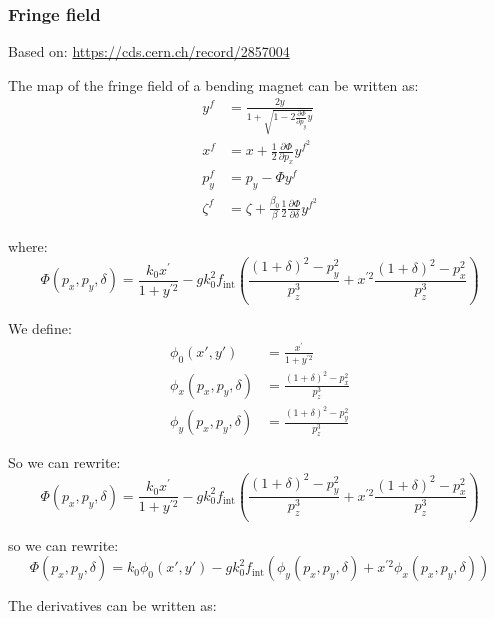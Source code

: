 \subsubsection{Fringe field}

Based on: \url{https://cds.cern.ch/record/2857004}

The map of the fringe field of a bending magnet can be written as:
\begin{align} 
y^f & =\frac{2 y}{1+\sqrt{1-2 \frac{\partial \Phi}{\partial p_y} y}} \\ 
x^f & =x+\frac{1}{2} \frac{\partial \Phi}{\partial p_x} y^{f^2} \\
p_y^f & =p_y-\Phi y^f \\ 
\zeta^f & =\zeta+\frac{\beta_0}{\beta}\frac{1}{2} \frac{\partial \Phi}{\partial \delta} y^{f^2}
\end{align}


where:
\begin{equation}
\Phi\left(p_x, p_y, \delta\right)=\frac{k_0 x^{\prime}}{1+y^{\prime 2}}
-g k_0^2 f_\text{int}
\left(\frac{(1+\delta)^2-p_y^2}{p_z^3}
+x^{\prime 2}
\frac{(1+\delta)^2-p_x^2}{p_z^3}\right)
\end{equation}

We define:
\begin{align}
\phi_0(x', y') &= \frac{x^{\prime}}{1+y^{\prime 2}}\\
\phi_x(p_x, p_y, \delta) &= \frac{(1+\delta)^2-p_x^2}{p_z^3}\\
\phi_y(p_x, p_y, \delta) &= \frac{(1+\delta)^2-p_y^2}{p_z^3}
\end{align}

So we can rewrite:
\begin{equation}
\Phi\left(p_x, p_y, \delta\right)=\frac{k_0 x^{\prime}}{1+y^{\prime 2}}
-g k_0^2 f_\text{int}
\left(\frac{(1+\delta)^2-p_y^2}{p_z^3}
+x^{\prime 2}
\frac{(1+\delta)^2-p_x^2}{p_z^3}\right)
\end{equation}

so we can rewrite:
\begin{equation}
\Phi\left(p_x, p_y, \delta\right)=
k_0 \phi_0(x', y')
-g k_0^2 f_\text{int} \left(
\phi_y(p_x, p_y, \delta) +x^{\prime 2} \phi_x(p_x, p_y, \delta)
\right)
\end{equation}

The derivatives can be written as:

